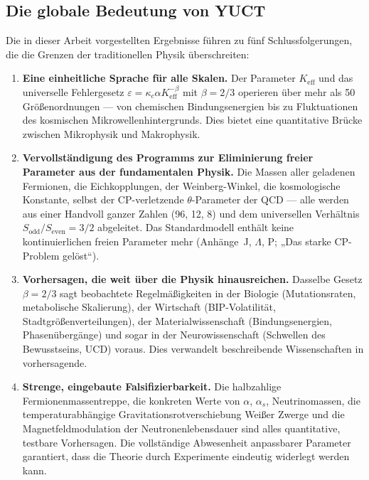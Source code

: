 \documentclass[11pt,a4paper]{article}
\begin{document}
	\subsection{Die globale Bedeutung von YUCT}
	
	Die in dieser Arbeit vorgestellten Ergebnisse führen zu fünf Schlussfolgerungen, die die Grenzen der traditionellen Physik überschreiten:
	
	\begin{enumerate}
		\item \textbf{Eine einheitliche Sprache für alle Skalen.}
		Der Parameter \(K_{\mathrm{eff}}\) und das universelle Fehlergesetz
		\(\varepsilon = \kappa_c \alpha K_{\mathrm{eff}}^{-\beta}\) mit \(\beta = 2/3\) operieren über
		mehr als 50 Größenordnungen — von chemischen Bindungsenergien bis zu Fluktuationen des kosmischen Mikrowellenhintergrunds.
		Dies bietet eine quantitative Brücke zwischen Mikrophysik und Makrophysik.
		
		\item \textbf{Vervollständigung des Programms zur Eliminierung freier Parameter aus der fundamentalen Physik.}
		Die Massen aller geladenen Fermionen, die Eichkopplungen, der Weinberg-Winkel, die
		kosmologische Konstante, selbst der CP-verletzende \(\theta\)-Parameter der QCD — alle werden
		aus einer Handvoll ganzer Zahlen (96, 12, 8) und dem universellen Verhältnis
		\(S_{\mathrm{odd}}/S_{\mathrm{even}} = 3/2\) abgeleitet. Das Standardmodell enthält keine kontinuierlichen freien Parameter mehr (Anhänge~J, \(\Lambda\), P; „Das starke CP-Problem gelöst“).
		
		\item \textbf{Vorhersagen, die weit über die Physik hinausreichen.}
		Dasselbe Gesetz \(\beta = 2/3\) sagt beobachtete Regelmäßigkeiten in der Biologie (Mutationsraten,
		metabolische Skalierung), der Wirtschaft (BIP-Volatilität, Stadtgrößenverteilungen), der Materialwissenschaft
		(Bindungsenergien, Phasenübergänge) und sogar in der Neurowissenschaft (Schwellen des Bewusstseins,
		UCD) voraus. Dies verwandelt beschreibende Wissenschaften in vorhersagende.
		
		\item \textbf{Strenge, eingebaute Falsifizierbarkeit.}
		Die halbzahlige Fermionenmassentreppe, die konkreten Werte von \(\alpha\), \(\alpha_s\),
		Neutrinomassen, die temperaturabhängige Gravitationsrotverschiebung Weißer Zwerge und die
		Magnetfeldmodulation der Neutronenlebensdauer sind alles quantitative, testbare
		Vorhersagen. Die vollständige Abwesenheit anpassbarer Parameter garantiert, dass die Theorie
		durch Experimente eindeutig widerlegt werden kann.
		

\end{enumerate}
\end{document}
